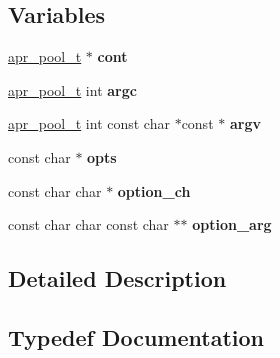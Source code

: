 \subsection*{Variables}
\begin{DoxyCompactItemize}
\item 
\mbox{\label{group__apr__getopt_ga34abb83ffac9faa953a5e35ea298e29f}} 
\mbox{\hyperlink{group__apr__pools_gaf137f28edcf9a086cd6bc36c20d7cdfb}{apr\+\_\+pool\+\_\+t}} $\ast$ {\bfseries cont}
\item 
\mbox{\label{group__apr__getopt_ga6bdebf9385dc069c90aa21989641be02}} 
\mbox{\hyperlink{group__apr__pools_gaf137f28edcf9a086cd6bc36c20d7cdfb}{apr\+\_\+pool\+\_\+t}} int {\bfseries argc}
\item 
\mbox{\label{group__apr__getopt_ga675a108e956f4e2ea74dae8d26e6273e}} 
\mbox{\hyperlink{group__apr__pools_gaf137f28edcf9a086cd6bc36c20d7cdfb}{apr\+\_\+pool\+\_\+t}} int const char $\ast$const  $\ast$ {\bfseries argv}
\item 
\mbox{\label{group__apr__getopt_ga750f41de75ba000ae8bb4859e91835a1}} 
const char $\ast$ {\bfseries opts}
\item 
\mbox{\label{group__apr__getopt_ga4684e1412a5bbd73e963c3dbb45dc3f0}} 
const char char $\ast$ {\bfseries option\+\_\+ch}
\item 
\mbox{\label{group__apr__getopt_ga237497a2dba41f8f2e6999065f542e3e}} 
const char char const char $\ast$$\ast$ {\bfseries option\+\_\+arg}
\end{DoxyCompactItemize}


\subsection{Detailed Description}


\subsection{Typedef Documentation}
\mbox{\label{group__apr__getopt_gad0f6c9baec81bc84293e0f1e2262656e}} 
